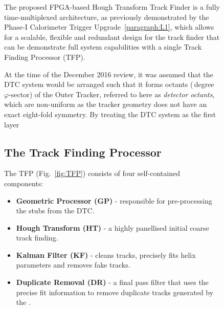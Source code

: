 \begin{figure}[tb]
The proposed FPGA-based Hough Transform Track Finder is a fully time-multiplexed architecture, as previously demonstrated by the Phase-I Calorimeter Trigger Upgrade~\ref{paragraph:L1}, which allows for a scalable, flexible and redundant design for the track finder that can be demonstrate full system capabilities with a single Track Finding Processor (TFP).

At the time of the December 2016 review, it was assumed that the DTC system would be arranged such that it forms octants (\,degree $\varphi$-sector) of the Outer Tracker, referred to here as \emph{detector octants}, which are non-uniform as the tracker geometry does not have an exact eight-fold symmetry.
By treating the DTC system as the first layer 

\subsection{The Track Finding Processor}
%
%

The TFP (Fig.~\ref{fig:TFP}) consists of four self-contained components:
\begin{itemize}
\item {\bf Geometric Processor (GP)} - responsible for pre-processing the stubs from the DTC.
\item {\bf Hough Transform (HT)} - a highly panellised initial coarse track finding.
\item {\bf Kalman Filter (KF)} - cleans tracks, precisely fits helix parameters and removes fake tracks.
\item {\bf Duplicate Removal (DR)} - a final pass filter that uses the precise fit information to remove duplicate tracks generated by the \HT.
\end{itemize}


\end{figure}
